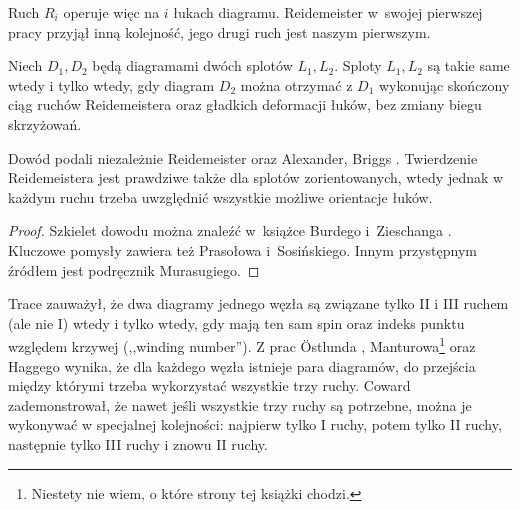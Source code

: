 Ruch $R_i$ operuje więc na $i$ łukach diagramu.
Reidemeister w~swojej pierwszej pracy przyjął inną kolejność, jego drugi ruch jest naszym pierwszym.

\begin{theorem}[Reidemeister, 1927]
\label{thm:reidemeister}%
%
%
    Niech $D_1, D_2$ będą diagramami dwóch splotów $L_1, L_2$.
    Sploty $L_1, L_2$ są takie same wtedy i tylko wtedy, gdy diagram $D_2$ można otrzymać z $D_1$ wykonując skończony ciąg ruchów Reidemeistera oraz gładkich deformacji łuków, bez zmiany biegu skrzyżowań.
\end{theorem}

Dowód podali niezależnie Reidemeister \cite{reidemeister27} oraz Alexander, Briggs \cite{briggs27}.
%
%
Twierdzenie Reidemeistera jest prawdziwe także dla splotów zorientowanych, wtedy jednak w każdym ruchu trzeba uwzględnić wszystkie możliwe orientacje łuków.

\begin{proof}
%
%
%
%
    Szkielet dowodu można znaleźć w~książce Burdego i~Zieschanga \cite[s. 9-11]{burde14}.
    Kluczowe pomysły zawiera też \cite[s. 11-12]{prasolov97} Prasołowa i~Sosińskiego.
    Innym przystępnym źródłem jest podręcznik \cite[s. 50-56]{murasugi96} Murasugiego.
\end{proof}

Trace \cite{trace83} zauważył, że dwa diagramy jednego węzła są związane tylko II i III ruchem (ale nie I) wtedy i tylko wtedy, gdy mają ten sam spin oraz indeks punktu względem krzywej (,,winding number'').
%
Z prac Östlunda \cite{ostlund01}, Manturowa\footnote{Niestety nie wiem, o które strony tej książki chodzi.} \cite{manturov04} oraz Haggego \cite{hagge06} wynika, że dla każdego węzła istnieje para diagramów, do przejścia między którymi trzeba wykorzystać wszystkie trzy ruchy.
%
%
%
Coward \cite{coward06} zademonstrował, że nawet jeśli wszystkie trzy ruchy są potrzebne, można je wykonywać w specjalnej kolejności: najpierw tylko I ruchy, potem tylko II ruchy, następnie tylko III ruchy i znowu II ruchy.
%

